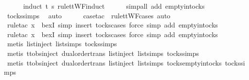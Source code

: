 \ \ \ \ \isamarkupfalse%
\ {\isacharparenleft}induct\ t\ s\ rule{\isacharcolon}ttWF{}{\isachardot}induct{\isacharparenright}\isanewline
\ \ \ \ \isamarkupfalse%
\ {\isacharparenleft}simp{\isacharunderscore}all\ add{\isacharcolon}\ empty{\isacharunderscore}in{\isacharunderscore}tocks{\isacharparenright}\isanewline
\ \ \ \ \isamarkupfalse%
\ tocks{\isachardot}simps\ \isamarkupfalse%
\ auto{\isacharbrackleft}{}{\isacharbrackright}\isanewline
\ \ \ \ \isamarkupfalse%
\ {\isacharparenleft}case{\isacharunderscore}tac\ {\isasymsigma}\ rule{\isacharcolon}ttWF{\isachardot}cases{\isacharcomma}\ auto{\isacharparenright}\isanewline
\ \ \ \ \isamarkupfalse%
\ {\isacharparenleft}rule{\isacharunderscore}tac\ x{\isacharequal}{\isachardoublequoteopen}{\isacharbrackleft}{\isacharbrackright}{\isachardoublequoteclose}\ \ bexI{\isacharcomma}\ simp{\isacharcomma}\ insert\ tocks{\isachardot}cases{\isacharcomma}\ force{\isacharcomma}\ simp\ add{\isacharcolon}\ empty{\isacharunderscore}in{\isacharunderscore}tocks{\isacharparenright}\isanewline
\ \ \ \ \isamarkupfalse%
\ {\isacharparenleft}rule{\isacharunderscore}tac\ x{\isacharequal}{\isachardoublequoteopen}{\isacharbrackleft}{\isacharbrackright}{\isachardoublequoteclose}\ \ bexI{\isacharcomma}\ simp{\isacharcomma}\ insert\ tocks{\isachardot}cases{\isacharcomma}\ force{\isacharcomma}\ simp\ add{\isacharcolon}\ empty{\isacharunderscore}in{\isacharunderscore}tocks{\isacharparenright}\isanewline
\ \ \ \ \isamarkupfalse%
\ {\isacharparenleft}metis\ list{\isachardot}inject\ list{\isachardot}simps{\isacharparenleft}{}{\isacharparenright}\ tocks{\isachardot}simps{\isacharparenright}\isanewline
\ \ \ \ \isamarkupfalse%
\ {\isacharparenleft}metis\ ttobs{\isachardot}inject{\isacharparenleft}{}{\isacharparenright}\ dual{\isacharunderscore}order{\isachardot}trans\ list{\isachardot}inject\ list{\isachardot}simps{\isacharparenleft}{}{\isacharparenright}\ tocks{\isachardot}simps{\isacharparenright}\isanewline
\ \ \ \ \isamarkupfalse%
\ {\isacharparenleft}metis\ ttobs{\isachardot}inject{\isacharparenleft}{}{\isacharparenright}\ dual{\isacharunderscore}order{\isachardot}trans\ list{\isachardot}inject\ list{\isachardot}simps{\isacharparenleft}{}{\isacharparenright}\ tocks{\isachardot}empty{\isacharunderscore}in{\isacharunderscore}tocks\ tocks{\isachardot}simps{\isacharparenright}\isanewline
